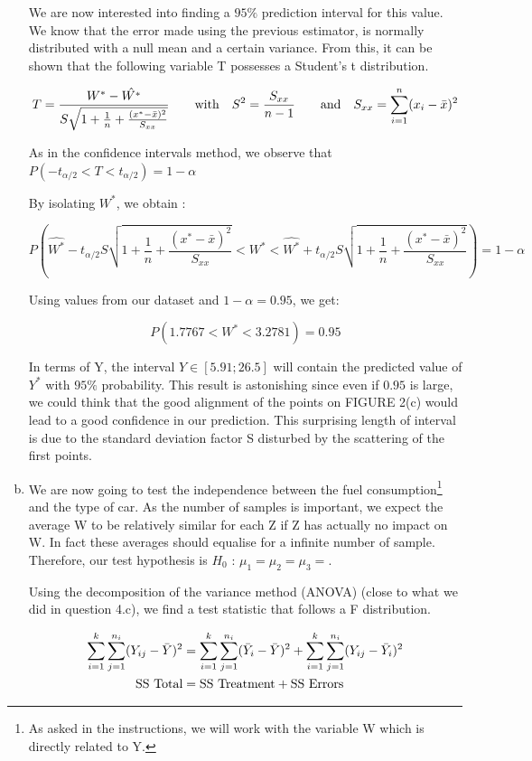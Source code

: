 \documentclass[a4paper]{article}
\begin{document}
\begin{enumerate}[(a)]
We are now interested into finding a $95\%$ prediction interval for this value. We know that the error made using the previous estimator, is normally distributed with a null mean and a certain variance. From this, it can be shown that the following variable T possesses a Student's t distribution.

$$T = \frac{W^*-\hat{W^*}}{S\sqrt{1+\frac{1}{n}+\frac{(x^*-\bar{x})^2}{S_{xx}}}} \qquad \textup{with} \quad S^2= \frac{S_{xx}}{n-1} \qquad \textup{and} \quad S_{xx} = \sum_{i=1}^n (x_i-\bar{x})^2  $$

As in the confidence intervals method, we observe that $P(-t_{\alpha /2} < T < t_{\alpha /2}) = 1-\alpha$

By isolating $W^*$, we obtain :

$$P\left ( \hat{W^*}-t_{\alpha/2}S\sqrt{1+\frac{1}{n}+\frac{(x^*-\bar{x})^2}{S_{xx}}} < W^* < \hat{W^*}+t_{\alpha/2}S\sqrt{1+\frac{1}{n}+\frac{(x^*-\bar{x})^2}{S_{xx}}} \right ) = 1-\alpha$$

Using values from our dataset and $1-\alpha = 0.95$, we get:

$$P\left (1.7767 < W^* < 3.2781 \right ) = 0.95$$

In terms of Y, the interval $Y \in \left [ 5.91;26.5 \right ]$ will contain the predicted value of $Y^*$ with $95\%$ probability. This result is astonishing since even if $0.95$ is large, we could think that the good alignment of the points on FIGURE 2(c) would lead to a good confidence in our prediction. This surprising length  of interval is due to the standard deviation factor S disturbed by the scattering of the first points.

\item We are now going to test the independence between the fuel consumption\footnote{As asked in the instructions, we will work with the variable W which is directly related to Y.} and the type of car. As the number of samples is important, we expect the average W to be relatively similar for each Z if Z has actually no impact on W. In fact these averages should equalise for a infinite number of sample. Therefore, our test hypothesis is $H_0$ : $ \mu_1= \mu_2 = \mu_3=$.

Using the decomposition of the variance method (ANOVA) (close to what we did in question 4.c), we find a test statistic that follows a F distribution.

\nonumber
\begin{equation} \label{eq3}
\begin{split}
\sum_{i=1}^k \sum_{j=1}^{n_i} (Y_{ij}-\bar{Y})^2 & =  \sum_{i=1}^k \sum_{j=1}^{n_i}(\bar{Y}_{i}-\bar{Y})^2 + \sum_{i=1}^k \sum_{j=1}^{n_i} (Y_{ij}-\bar{Y}_i)^2\\
 \textup{SS Total} & = \textup{SS Treatment} + \textup{SS Errors}
\end{split}
\end{equation}



\end{enumerate}
\end{document}
